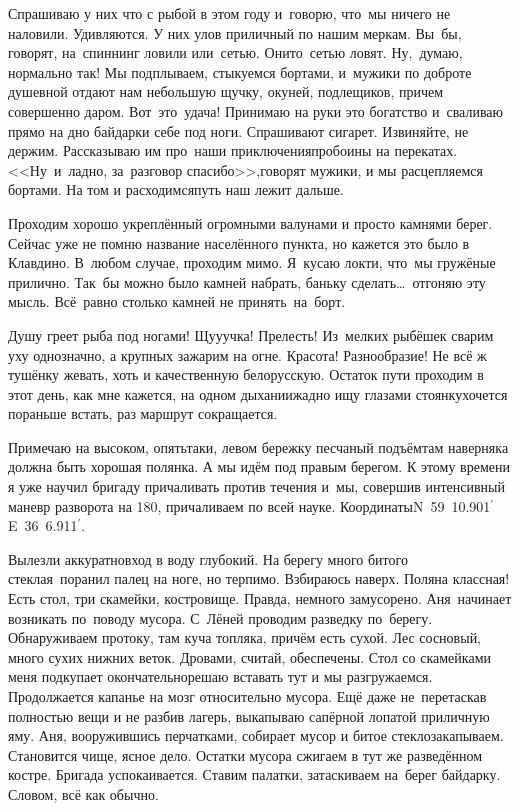 Спрашиваю у них что с рыбой в этом году и~говорю, что~мы ничего не наловили. Удивляются. У них улов приличный по нашим меркам. Вы~бы, говорят, на~спиннинг ловили или~сетью. Они\sdash то~сетью ловят. Ну,~думаю, нормально так! Мы подплываем, стыкуемся бортами, и~мужики по доброте душевной отдают нам небольшую щучку, окуней, подлещиков, причем совершенно даром. Вот~это~удача! Принимаю на руки это богатство и~сваливаю прямо на дно байдарки себе под ноги. Спрашивают сигарет. Извиняйте, не держим. Рассказываю им про~наши приключения\mdash пробоины на перекатах. <<Ну~и~ладно, за~разговор спасибо>>,\mdash говорят мужики, и мы расцепляемся бортами. На том и расходимся\mdash путь наш лежит дальше.

Проходим хорошо укреплённый огромными валунами и просто камнями берег. Сейчас уже не помню название населённого пункта, но кажется это было в Клавдино. В~любом случае, проходим мимо. Я~кусаю локти, что~мы гружёные прилично. Так~бы можно было камней набрать, баньку сделать\ldots~отгоняю эту мысль. Всё~равно столько камней не принять~на~борт.

Душу греет рыба под ногами! Щу\sdash у\sdash учка! Прелесть! Из~мелких рыбёшек сварим уху однозначно, а крупных зажарим на огне. Красота! Разнообразие! Не всё ж тушёнку жевать, хоть и качественную белорусскую. Остаток пути проходим в этот день, как мне кажется, на одном дыхании\mdash жадно ищу глазами стоянку\mdash хочется пораньше встать, раз маршрут сокращается. 

Примечаю на высоком, опять\sdash таки, левом бережку песчаный подъём\mdash там наверняка должна быть хорошая полянка. А мы идём под правым берегом. К этому времени я уже научил бригаду причаливать против течения и~мы, совершив интенсивный маневр разворота на 180\degree, причаливаем по всей науке. Координаты\mdash N~59\degree~10.901$^\prime$~ E~36\degree~6.911$^\prime$. 

Вылезли аккуратно\mdash вход в воду глубокий. На берегу много битого стекла\mdash я~поранил палец на ноге, но терпимо. Взбираюсь наверх. Поляна классная! Есть стол, три скамейки, костровище. Правда, немного замусорено. Аня~начинает возникать по~поводу мусора. С~Лёней проводим разведку по~берегу. Обнаруживаем протоку, там куча топляка, причём есть сухой. Лес сосновый, много сухих нижних веток. Дровами, считай, обеспечены. Стол со скамейками меня подкупает окончательно\mdash решаю вставать тут и мы разгружаемся. Продолжается капанье на мозг относительно мусора. Ещё даже не~перетаскав полностью вещи и не разбив лагерь, выкапываю сапёрной лопатой приличную яму. Аня, вооружившись перчатками, собирает мусор и битое стекло\mdash закапываем. Становится чище, ясное дело. Остатки мусора сжигаем в тут же разведённом костре. Бригада успокаивается. Ставим палатки, затаскиваем на~берег байдарку. Словом, всё как обычно. 

